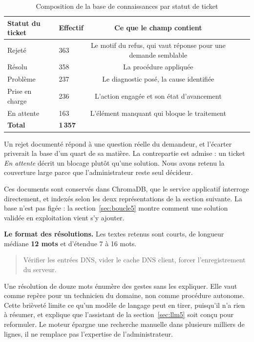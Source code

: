\begin{table}[!htbp]
\centering
\styletableau
\caption{Composition de la base de connaissances par statut de ticket}
\label{tab:kb5}
\begin{tabular}{|Lp{4.6cm}|Cp{2.4cm}|Lp{6.4cm}|}
\hline
{}
\textbf{Statut du ticket} & \textbf{Effectif} & \textbf{Ce que le champ contient} \\
\hline
Rejeté & 363 & Le motif du refus, qui vaut réponse pour une demande semblable \\
\hline
Résolu & 358 & La procédure appliquée \\
\hline
Problème & 237 & Le diagnostic posé, la cause identifiée \\
\hline
Prise en charge & 236 & L'action engagée et son état d'avancement \\
\hline
En attente & 163 & L'élément manquant qui bloque le traitement \\
\hline
{}
\textbf{Total} & \textbf{1\,357} & \\
\hline
\end{tabular}
\end{table}

Un rejet documenté répond à une question réelle du demandeur, et l'écarter priverait la base d'un
quart de sa matière. La contrepartie est admise : un ticket \emph{En attente} décrit un blocage
plutôt qu'une solution. Nous avons retenu la couverture large parce que l'administrateur reste seul
décideur.

Ces documents sont conservés dans ChromaDB, que le service applicatif interroge directement, et
indexés selon les deux représentations de la section suivante. La base n'est pas figée : la
section~\ref{sec:boucle5} montre comment une solution validée en exploitation vient s'y ajouter.

\textbf{Le format des résolutions.} Les textes retenus sont courts, de longueur médiane \textbf{12 mots} et d'étendue 7 à 16 mots.

\begin{quote}
\og Vérifier les entrées DNS, vider le cache DNS client, forcer l'enregistrement du serveur. \fg{}
\end{quote}

Une résolution de douze mots énumère des gestes sans les expliquer. Elle vaut comme repère pour un
technicien du domaine, non comme procédure autonome. Cette brièveté limite ce qu'un modèle de
langage peut en tirer, puisqu'il n'a rien à résumer, et explique que l'assistant de la
section~\ref{sec:llm5} soit conçu pour reformuler. Le moteur épargne une recherche manuelle dans
plusieurs milliers de lignes, il ne remplace pas l'expertise de l'administrateur.

